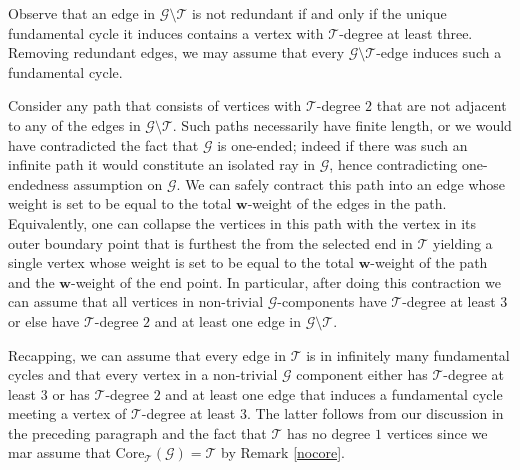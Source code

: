 \documentclass[letterpaper,11pt,reqno]{amsart}
\theoremstyle{bfnote}
\theoremstyle{definition}
\newcommand{\0}{\varnothing}
\newcommand{\w}{\mathbf{w}}
\numberwithin{equation}{section}
\begin{document}
Observe that an edge in $\mathcal  G\setminus \mathcal  T$ is not redundant if and only if the unique fundamental cycle it induces contains a vertex with $\mathcal{T}$-degree at least three.  Removing redundant edges, we may assume that every $\mathcal{G}\setminus \mathcal{T}$-edge induces such a fundamental cycle.


Consider any path that consists of vertices with $\mathcal{T}$-degree $2$ that are not adjacent to any of the edges in $\mathcal{G}\setminus \mathcal{T}$.
Such paths necessarily have finite length, or we would have contradicted the fact that $\mathcal G$ is one-ended;
indeed if there was such an infinite path it would constitute an isolated ray in $\mathcal{G}$, hence contradicting one-endedness assumption on $\mathcal{G}$. We can safely contract this path into an edge whose weight is set to be equal to the total $\w$-weight of the edges in the path. Equivalently, one can collapse the vertices in this path with the vertex in its outer boundary point that is furthest the from the selected end in $\mathcal{T}$ yielding a single vertex whose weight is set to be equal to the total $\w$-weight of the path and the $\w$-weight of the end point.
In particular, after doing this contraction we can assume that all vertices in non-trivial $\mathcal{G}$-components have $\mathcal{T}$-degree at least $3$ or else have $\mathcal{T}$-degree $2$ and at least one edge in $\mathcal{G}\setminus \mathcal{T}$. 

Recapping, we can assume that every edge in $\mathcal{T}$ is in infinitely many fundamental cycles and that every vertex in a non-trivial $\mathcal{G}$ component either has $\mathcal{T}$-degree at least $3$ or has $\mathcal{T}$-degree $2$ and at least one edge that induces a fundamental cycle meeting a vertex of $\mathcal{T}$-degree at least $3$.  The latter follows from our discussion in the preceding paragraph and the fact that $\mathcal{T}$ has no degree $1$ vertices since we mar assume that $\mathrm{Core}_{\mathcal{T}}(\mathcal{G})=\mathcal T$ by Remark \ref{nocore}.
\end{document}
